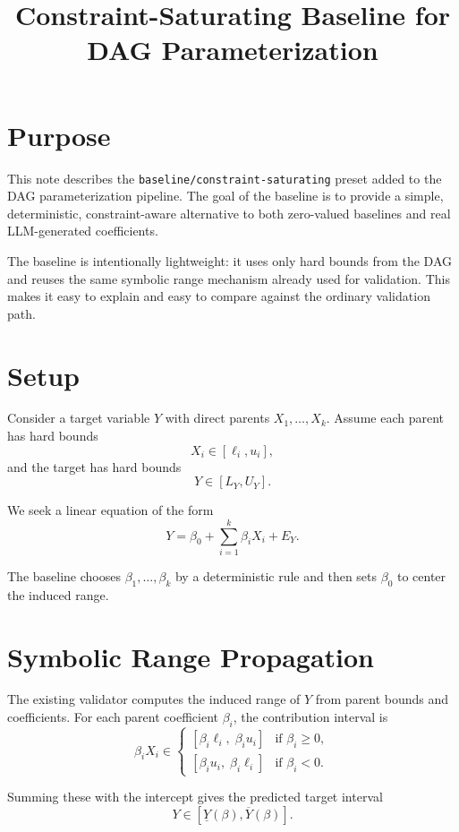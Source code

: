 \documentclass[11pt]{article}
\title{Constraint-Saturating Baseline for DAG Parameterization}
\author{}
\date{}
\begin{document}
\maketitle

\section{Purpose}

This note describes the \texttt{baseline/constraint-saturating} preset added to the DAG parameterization pipeline. The goal of the baseline is to provide a simple, deterministic, constraint-aware alternative to both zero-valued baselines and real LLM-generated coefficients.

The baseline is intentionally lightweight: it uses only hard bounds from the DAG and reuses the same symbolic range mechanism already used for validation. This makes it easy to explain and easy to compare against the ordinary validation path.

\section{Setup}

Consider a target variable $Y$ with direct parents $X_1, \dots, X_k$. Assume each parent has hard bounds
\[
X_i \in [\ell_i, u_i],
\]
and the target has hard bounds
\[
Y \in [L_Y, U_Y].
\]

We seek a linear equation of the form
\[
Y = \beta_0 + \sum_{i=1}^k \beta_i X_i + E_Y.
\]

The baseline chooses $\beta_1, \dots, \beta_k$ by a deterministic rule and then sets $\beta_0$ to center the induced range.

\section{Symbolic Range Propagation}

The existing validator computes the induced range of $Y$ from parent bounds and coefficients. For each parent coefficient $\beta_i$, the contribution interval is
\[
\beta_i X_i \in
\begin{cases}
[\beta_i \ell_i,\; \beta_i u_i] & \text{if } \beta_i \ge 0, \\
[\beta_i u_i,\; \beta_i \ell_i] & \text{if } \beta_i < 0.
\end{cases}
\]

Summing these with the intercept gives the predicted target interval
\[
Y \in [\underline{Y}(\beta), \overline{Y}(\beta)].
\]
\end{document}

